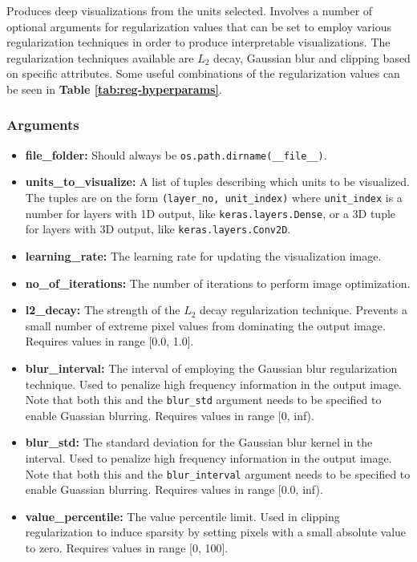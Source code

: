 \noindent Produces deep visualizations from the units selected. Involves a number of optional arguments for regularization values that can be set to employ various regularization techniques in order to produce interpretable visualizations. The regularization techniques available are $L_2$ decay, Gaussian blur and clipping based on specific attributes. Some useful combinations of the regularization values can be seen in \textbf{Table \ref{tab:reg-hyperparams}}.

\subsubsection{Arguments}

\begin{itemize}
    \item \textbf{file\_folder:} Should always be \texttt{os.path.dirname(\_\_file\_\_)}.
    \item \textbf{units\_to\_visualize:} A list of tuples describing which units to be visualized. The tuples are on the form \texttt{(layer\_no, unit\_index)} where \texttt{unit\_index} is a number for layers with 1D output, like \texttt{keras.layers.Dense}, or a 3D tuple for layers with 3D output, like \texttt{keras.layers.Conv2D}.
    \item \textbf{learning\_rate:} The learning rate for updating the visualization image.
    \item \textbf{no\_of\_iterations:} The number of iterations to perform image optimization.
    \item \textbf{l2\_decay:} The strength of the $L_2$ decay regularization technique. Prevents a small number of extreme pixel values from dominating the output image. Requires values in range [0.0, 1.0].
    \item \textbf{blur\_interval:} The interval of employing the Gaussian blur regularization technique. Used to penalize high frequency information in the output image. Note that both this and the \texttt{blur\_std} argument needs to be specified to enable Guassian blurring. Requires values in range [0, inf).
    \item \textbf{blur\_std:} The standard deviation for the Gaussian blur kernel in the interval. Used to penalize high frequency information in the output image. Note that both this and the \texttt{blur\_interval} argument needs to be specified to enable Guassian blurring. Requires values in range [0.0, inf).
    \item \textbf{value\_percentile:} The value percentile limit. Used in clipping regularization to induce sparsity by setting pixels with a small absolute value to zero. Requires values in range [0, 100].

\end{itemize}
